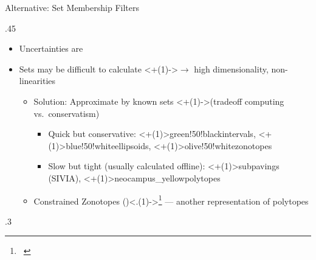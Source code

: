 \documentclass[aspectratio=169]{conf-beamer}
\begin{document}
\begin{frame}{Alternative: Set Membership Filters}

  \vfill
  \begin{overlayarea}{\textwidth}{.45\paperheight}
    \begin{itemize}[<+(1)->]
      \item[+] Uncertainties are 
      \item[-] Sets may be difficult to calculate \onslide<+(1)->{$\to$ high dimensionality, non-linearities}
            \begin{itemize}
              \item Solution: Approximate by known sets \structure<+(1)->{(tradeoff computing vs.\ conservatism)}
                    \begin{itemize}
                      \item Quick but conservative: {\color<+(1)>{green!50!black}{intervals}}, {\color<+(1)>{blue!50!white}{ellipsoids}}, {\color<+(1)>{olive!50!white}{zonotopes}}
                      \item Slow but tight (usually calculated offline): \alert<+(1)>{subpavings (SIVIA)}, {\color<+(1)>{neocampus_yellow}{polytopes}}
                    \end{itemize}
              \item Constrained Zonotopes (\cz)\only<.(1)->{\footnote{\articlesymbol\ \cite{scott2016constrained}}} --- another representation of polytopes
            \end{itemize}
    \end{itemize}
  \end{overlayarea}

  \begin{overlayarea}{\textwidth}{.3\paperheight}
    \begin{minipage}[c]{.45\linewidth}
\end{minipage}
\end{overlayarea}
\end{frame}
\end{document}

